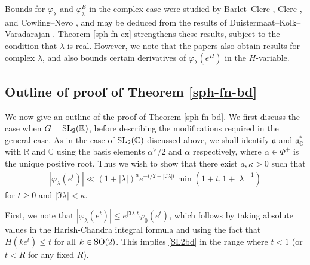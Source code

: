 \documentclass[12pt]{amsart}
\theoremstyle{remark}
\newcommand{\R}{\mathbb R}
\newcommand{\C}{\mathbb C}
\newcommand{\ga}{\mathfrak a}
\begin{document}
Bounds for $\varphi_\lambda$ and $\varphi_\lambda^E$ in the complex case were studied by Barlet--Clerc \cite{Barlet_Clerc_86}, Clerc \cite{Clerc_87}, and Cowling--Nevo \cite{Cowling_nevo_01}, and may be deduced from the results of Duistermaat--Kolk--Varadarajan \cite{Duistermaat_Kolk_Varadarajan_79}.  Theorem \ref{sph-fn-cx} strengthens these results, subject to the condition that $\lambda$ is real.  However, we note that the papers \cite{Barlet_Clerc_86,Clerc_87,Cowling_nevo_01} also obtain results for complex $\lambda$, and \cite{Cowling_nevo_01} also bounds certain derivatives of $\varphi_\lambda(e^H)$ in the $H$-variable.







\subsection{Outline of proof of Theorem \ref{sph-fn-bd}}
\label{sec:sph-fn-outline}

We now give an outline of the proof of Theorem \ref{sph-fn-bd}.  We first discuss the case when $G = \textnormal{SL}_2(\mathbb{R})$, before describing the modifications required in the general case.  As in the case of ${\rm SL}_2(\C)$ discussed above, we shall identify $\ga$ and $\ga^*_\C$ with $\R$ and $\C$ using the basis elements $\alpha^\vee/2$ and $\alpha$ respectively, where $\alpha \in \Phi^+$ is the unique positive root.  Thus we wish to show that there exist $a, \kappa > 0$ such that
\begin{gather}
\label{SL2bd}
    |\varphi_\lambda(e^t)| \ll (1 + |\lambda|)^a e^{-t/2 + |\Im \lambda| t} \min (1 + t, 1 + |\lambda|^{-1})
\end{gather}
for $t \geq 0$ and $|\Im \lambda| < \kappa$.

First, we note that $|\varphi_\lambda(e^t)| \le e^{|\Im \lambda| t} \varphi_0(e^t)$, which follows by taking absolute values in the Harish-Chandra integral formula and using the fact that $H(k e^t) \le t$ for all $k \in {\rm SO}(2)$.  This implies \eqref{SL2bd} in the range where $t < 1$ (or $t < R$ for any fixed $R$).
\end{document}
